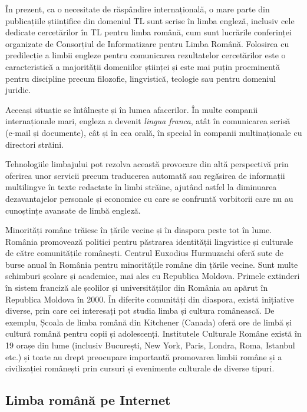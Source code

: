 \begin{multicols}{2}

În prezent, ca o necesitate de răspândire internațională, o mare parte din publicațiile științifice din domeniul TL sunt scrise în limba engleză, inclusiv cele dedicate cercetărilor în TL pentru limba română, cum sunt lucrările conferinței organizate de Consorțiul de Informatizare pentru Limba Română. Folosirea cu predilecție a limbii engleze pentru comunicarea rezultatelor cercetărilor este o caracteristică a majorității domeniilor științei și este mai puțin proeminentă pentru discipline precum filozofie, lingvistică, teologie sau pentru domeniul juridic.

Aceeași situație se întâlnește și în lumea afacerilor. În multe companii internaționale mari, engleza a devenit \textit{lingua franca}, atât în comunicarea scrisă (e-mail și documente), cât și în cea orală, în special în companii multinaționale cu directori străini.

Tehnologiile limbajului pot rezolva această provocare din altă perspectivă prin oferirea unor servicii precum traducerea automată sau regăsirea de informații multilingve în texte redactate în limbi străine, ajutând astfel la diminuarea dezavantajelor personale și economice cu care se confruntă vorbitorii care nu au cunoștințe avansate de limbă engleză.

Minorități române trăiesc în țările vecine și în diaspora peste tot în lume. România promovează politici pentru păstrarea identității lingvistice și culturale de către comunitățile românești. Centrul Euxodius Hurmuzachi oferă sute de burse anual în România pentru minoritățile române din țările vecine. Sunt multe schimburi școlare și academice, mai ales cu Republica Moldova. Primele extinderi în sistem franciză ale școlilor și universităților din România au apărut în Republica Moldova în 2000.
În diferite comunități din diaspora, există inițiative diverse, prin care cei interesați pot studia limba și cultura românească. De exemplu, Școala de limba română din Kitchener (Canada) oferă ore de limbă și cultură română pentru copii și adolescenți.
Institutele Culturale Române există în 19 orașe din lume (inclusiv București, New York, Paris, Londra, Roma, Istanbul etc.) și toate au drept preocupare importantă promovarea limbii române și a civilizației românești prin cursuri și evenimente culturale de diverse tipuri.

\subsection{Limba română pe Internet}


\end{multicols}
